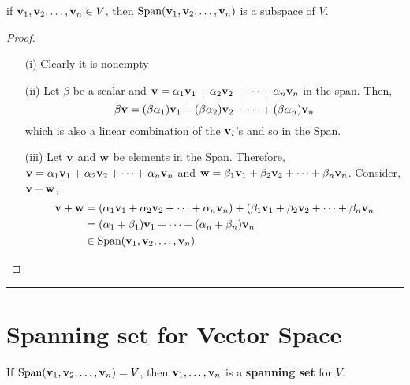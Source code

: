 \begin{theorem}
	if ${\bf v}_1, {\bf v}_2, \dots, {\bf v}_n  \in V$, then $ \text{Span}({\bf v}_1, {\bf v}_2, \dots, {\bf v}_n)$ is a subspace of $V$.
	
	\begin{proof}
		\begin{enumerate}
			\item[(i)] Clearly it is nonempty
			 
			
			
			\item[(ii)]  Let $\beta$ be a scalar and ${\bf v} = \alpha_1 {\bf v}_1 +  \alpha_2 {\bf v}_2 +  \cdots + \alpha_n {\bf v}_n$ in the span.    Then, 
			\[ \beta {\bf v} = (\beta \alpha_1) {\bf v}_1 + (\beta  \alpha_2) {\bf v}_2 +  \cdots + (\beta  \alpha_n) {\bf v}_n	\]
	which is also a linear combination of the ${\bf v}_i$'s and so in the Span.
	
	\item[(iii)]  Let ${\bf v}$ and ${\bf w}$ be elements in the Span.  Therefore,  $ {\bf v} = \alpha_1 {\bf v}_1 +  \alpha_2 {\bf v}_2 +  \cdots + \alpha_n {\bf v}_n$ and $ {\bf w} = \beta_1 {\bf v}_1 +  \beta_2 {\bf v}_2 +  \cdots + \beta_n {\bf v}_n$.  Consider, ${\bf v}+{\bf w}$, 
	\begin{align*}
		{\bf v}+{\bf w} &=  (\alpha_1 {\bf v}_1 +  \alpha_2 {\bf v}_2 +  \cdots + \alpha_n {\bf v}_n) +  ( \beta_1 {\bf v}_1 +  \beta_2 {\bf v}_2 +  \cdots + \beta_n {\bf v}_n\\
		&=  (\alpha_1+\beta_1) {\bf v}_1  +  \cdots + (\alpha_n + \beta_n) {\bf v}_n\\
		& \in  \text{Span}({\bf v}_1, {\bf v}_2, \dots, {\bf v}_n)
	\end{align*}
	
	\end{enumerate}
	\end{proof}
\end{theorem}
 
 \rule[0.01in]{\textwidth}{0.0025in}

 






\section*{Spanning set for Vector Space}
If $\text{Span}({\bf v}_1, {\bf v}_2, \dots, {\bf v}_n) = V$, then ${\bf v}_1, \dots, {\bf v}_n$ is a \textbf{spanning set} for $V$.

